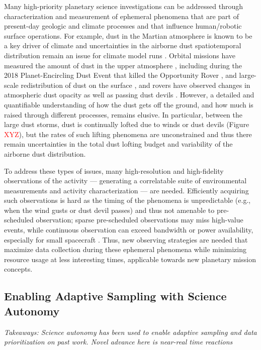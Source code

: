 Many high-priority planetary science investigations can be addressed through characterization and measurement of ephemeral phenomena that are part of present-day geologic and climate processes and that influence human/robotic surface operations. 
For example, dust in the Martian atmosphere is known to be a key driver of climate \citep{DecadalSurvey,Forget2017,Jackson2023} and uncertainties in the airborne dust spatiotemporal distribution remain an issue for climate model runs \citep{Madeleine2011,Mulholland2015}. 
Orbital missions have measured the amount of dust in the upper atmosphere \citep[e.g.,][]{Martin1986,Smith2001,Heavens2011,Heavens2019,Kass2020,Batterson2023}, including during the 2018 Planet-Encircling Dust Event that killed the Opportunity Rover \citep{Staab2020}, and large-scale redistribution of dust on the surface \citep[e.g.,][]{Bapst2022}, and rovers have observed changes in atmospheric dust opacity as well as passing dust devils \citep[e.g.,][]{Thomas1985,Metzger1999,Lemmon2015,Kurgansky2012,Jackson2022,Guzewich2023}.
However, a detailed and quantifiable understanding of how the dust gets off the ground, and how much is raised through different processes, remains elusive.
In particular, between the large dust storms, dust is continually lofted due to winds or dust devils (Figure \textcolor{red}{XYZ}), but the rates of such lifting phenomena are unconstrained and thus there remain uncertainties in the total dust lofting budget and variability of the airborne dust distribution. 

To address these types of issues, many high-resolution and high-fidelity observations of the activity --- generating a correlatable suite of environmental measurements and activity characterization --- are needed. 
Efficiently acquiring such observations is hard as the timing of the phenomena is unpredictable (e.g., when the wind gusts or dust devil passes) and thus not amenable to pre-scheduled observation; sparse pre-scheduled observations may miss high-value events, while continuous observation can exceed bandwidth or power availability, especially for small spacecraft \citep{Diniega2022,MCESAG}. 
Thus, new observing strategies are needed that maximize data collection during these ephemeral phenomena while minimizing resource usage at less interesting times, applicable towards new planetary mission concepts.

\subsection{Enabling Adaptive Sampling with Science Autonomy}
\textit{Takeaways: Science autonomy has been used to enable adaptive sampling and data prioritization on past work. Novel advance here is near-real time reactions}


